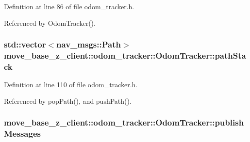 Definition at line 86 of file odom\+\_\+tracker.\+h.



Referenced by Odom\+Tracker().

\subsubsection[{\texorpdfstring{path\+Stack\+\_\+}{pathStack_}}]{\setlength{\rightskip}{0pt plus 5cm}std\+::vector$<$nav\+\_\+msgs\+::\+Path$>$ move\+\_\+base\+\_\+z\+\_\+client\+::odom\+\_\+tracker\+::\+Odom\+Tracker\+::path\+Stack\+\_\+\hspace{0.3cm}{\ttfamily [protected]}}\hypertarget{classmove__base__z__client_1_1odom__tracker_1_1OdomTracker_abb14ccfc0c5273714a5279baa07dfd11}{}\label{classmove__base__z__client_1_1odom__tracker_1_1OdomTracker_abb14ccfc0c5273714a5279baa07dfd11}


Definition at line 110 of file odom\+\_\+tracker.\+h.



Referenced by pop\+Path(), and push\+Path().

\subsubsection[{\texorpdfstring{publish\+Messages}{publishMessages}}]{ move\+\_\+base\+\_\+z\+\_\+client\+::odom\+\_\+tracker\+::\+Odom\+Tracker\+::publish\+Messages\hspace{0.3cm}{\ttfamily [protected]}}\hypertarget{classmove__base__z__client_1_1odom__tracker_1_1OdomTracker_a7fa39bb2ddd9e60778687c854ea0c59c}{}\label{classmove__base__z__client_1_1odom__tracker_1_1OdomTracker_a7fa39bb2ddd9e60778687c854ea0c59c}


